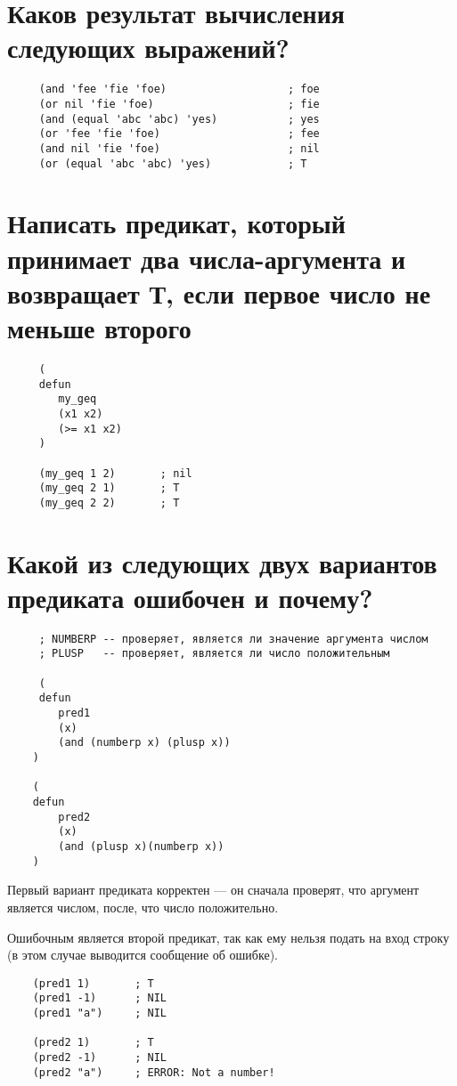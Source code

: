 \section{Каков результат вычисления следующих выражений?}

\begin{lstlisting}
     (and 'fee 'fie 'foe)                   ; foe
     (or nil 'fie 'foe)                     ; fie
     (and (equal 'abc 'abc) 'yes)           ; yes
     (or 'fee 'fie 'foe)                    ; fee
     (and nil 'fie 'foe)                    ; nil
     (or (equal 'abc 'abc) 'yes)            ; T
\end{lstlisting}

\section{Написать предикат, который принимает два числа-аргумента и возвращает
Т, если первое число не меньше второго}

\begin{lstlisting}
     (
     defun 
        my_geq
        (x1 x2)
        (>= x1 x2)
     )

     (my_geq 1 2)       ; nil
     (my_geq 2 1)       ; T
     (my_geq 2 2)       ; T
\end{lstlisting}

\section{Какой из следующих двух вариантов предиката ошибочен и почему?}

\begin{lstlisting}
     ; NUMBERP -- проверяет, является ли значение аргумента числом
     ; PLUSP   -- проверяет, является ли число положительным
     
     (
     defun 
        pred1 
        (x) 
        (and (numberp x) (plusp x))
    )

    (
    defun 
        pred2 
        (x)
        (and (plusp x)(numberp x))
    )
\end{lstlisting}

Первый вариант предиката корректен --- он сначала проверят, что аргумент является числом, после, что число положительно.

Ошибочным является второй предикат, так как ему нельзя подать на вход строку (в этом случае выводится сообщение об ошибке).
      
\begin{lstlisting}
    (pred1 1)       ; T
    (pred1 -1)      ; NIL
    (pred1 "a")     ; NIL

    (pred2 1)       ; T
    (pred2 -1)      ; NIL
    (pred2 "a")     ; ERROR: Not a number!
\end{lstlisting}


